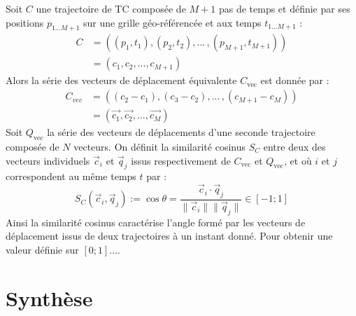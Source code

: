 \documentclass[../main.tex]{subfiles}
\begin{document}
Soit $C$ une trajectoire de TC composée de $M+1$ pas de temps et définie par ses positions $p_{1...M+1}$ sur une grille géo-référencée et aux temps $t_{1...M+1}$ :
%
\begin{align*}
    C &= ((p_1, t_1), (p_2, t_2), ...\,, (p_{M+1}, t_{M+1}))\\
      &= (c_1, c_2, ..., c_{M+1})
\end{align*}
%
Alors la série des vecteurs de déplacement équivalente $C_{\text{vec}}$ est donnée par :
\begin{align*}
    C_{vec} &= ((c_2 - c_1), (c_3 - c_2), ... \,, (c_{M+1} - c_M))\\
            &= (\vec{c_1}, \vec{c_2}, ..., \vec{c_M})
\end{align*}
%
Soit $Q_{\text{vec}}$ la série des vecteurs de déplacements d'une seconde trajectoire composée de $N$ vecteurs. On définit la similarité cosinus $S_C$ entre
deux des vecteurs individuels $\vec{c}_i$ et $\vec{q}_j$ issus respectivement de $C_{\text{vec}}$ et $Q_{\text{vec}}$, et où $i$ et $j$ correspondent au même
temps $t$ par :
%
\begin{equation*}
    S_C(\vec{c}_i, \vec{q}_j) := \cos \theta = \frac{\vec{c}_i \cdot \vec{q}_j}{\lVert \vec{c}_i \rVert \lVert \vec{q}_j \rVert} \in [-1; 1]
\end{equation*}
%
Ainsi la similarité cosinus caractérise l'angle formé par les vecteurs de déplacement issus de deux trajectoires à un instant donné. Pour obtenir une valeur
définie sur $[0; 1]$....

\section{Synthèse}
\end{document}
